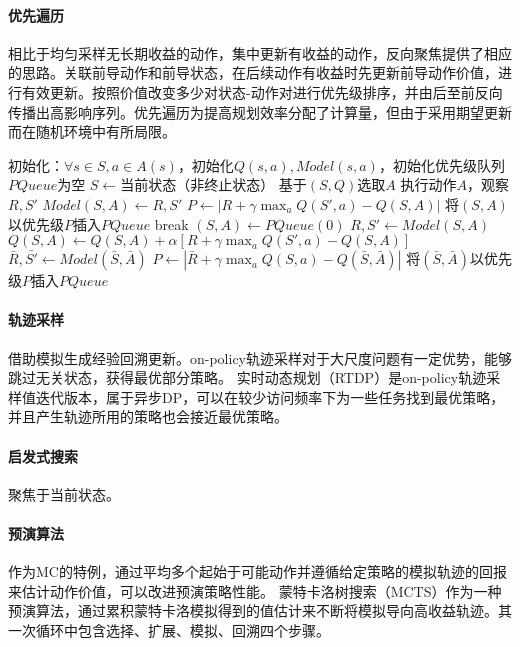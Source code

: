 \documentclass[
12pt, %
a4paper, 
oneside, %
headinclude,footinclude, %
]{scrartcl}
\begin{document}
\paragraph{优先遍历}
相比于均匀采样无长期收益的动作，集中更新有收益的动作，反向聚焦提供了相应的思路。关联前导动作和前导状态，在后续动作有收益时先更新前导动作价值，进行有效更新。按照价值改变多少对状态-动作对进行优先级排序，并由后至前反向传播出高影响序列。优先遍历为提高规划效率分配了计算量，但由于采用期望更新而在随机环境中有所局限。
\begin{myalgorithm}[确定性环境下的优先级遍历]
\State 初始化：$ \forall s \in S, a \in A(s) $，初始化$ Q(s, a), Model(s, a) $，初始化优先级队列$ PQueue $为空
\Loop
\State $ S \gets $当前状态（非终止状态）
\State 基于$ (S, Q) $选取$ A $ 
\State 执行动作$ A $，观察$ R,S' $
\State $ Model(S, A) \gets R,S'$
\State $ P \gets |R + \gamma \max_a Q(S', a) - Q(S, A)| $ 
\State 将$ (S, A) $以优先级$ P $插入$ PQueue $
\EndIf
{} 
\State break
\EndIf
\State $ (S, A) \gets PQueue(0) $ 
\State $ R, S' \gets Model(S, A) $ 
\State $ Q(S, A) \gets Q(S, A) + \alpha[R + \gamma \max_a Q(S', a) - Q(S, A)] $ 
 
\State $ \bar{R},\bar{S'} \gets Model(\bar{S}, \bar{A}) $
\State $ P \gets |\bar{R} + \gamma \max_a Q(S, a) - Q(\bar{S}, \bar{A})| $
\State 将$ (\bar{S}, \bar{A}) $以优先级$ P $插入$ PQueue $
\EndIf
\EndIf
\EndFor
\EndFor
\EndLoop
\end{myalgorithm}
\paragraph{轨迹采样}
借助模拟生成经验回溯更新。on-policy轨迹采样对于大尺度问题有一定优势，能够跳过无关状态，获得最优部分策略。
实时动态规划（RTDP）是on-policy轨迹采样值迭代版本，属于异步DP，可以在较少访问频率下为一些任务找到最优策略，并且产生轨迹所用的策略也会接近最优策略。
\paragraph{启发式搜索}
聚焦于当前状态。
\paragraph{预演算法}
作为MC的特例，通过平均多个起始于可能动作并遵循给定策略的模拟轨迹的回报来估计动作价值，可以改进预演策略性能。
蒙特卡洛树搜索（MCTS）作为一种预演算法，通过累积蒙特卡洛模拟得到的值估计来不断将模拟导向高收益轨迹。其一次循环中包含选择、扩展、模拟、回溯四个步骤。
\end{document}
